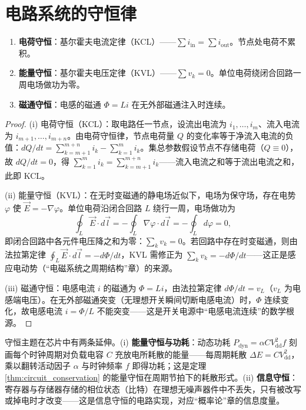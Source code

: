 \section{电路系统的守恒律}

\begin{theorem}[电路系统的三种守恒律]\label{thm:circuit_conservation}
\begin{enumerate}[label=(\roman*)]
    \item \textbf{电荷守恒}：基尔霍夫电流定律（KCL）——$\sum i_{\text{in}} = \sum i_{\text{out}}$。节点处电荷不累积。
    \item \textbf{能量守恒}：基尔霍夫电压定律（KVL）——$\sum v_k = 0$。单位电荷绕闭合回路一周电场做功为零。
    \item \textbf{磁通守恒}：电感的磁通 $\Phi = Li$ 在无外部磁通注入时连续。
\end{enumerate}
\end{theorem}

\begin{proof}
(i) 电荷守恒（KCL）：取电路任一节点，设流出电流为 $i_1,\dots,i_m$、流入电流为 $i_{m+1},\dots,i_{m+n}$。由电荷守恒律，节点电荷量 $Q$ 的变化率等于净流入电流的负值：$dQ/dt = \sum_{k=m+1}^{m+n}i_k - \sum_{k=1}^{m}i_k$。集总参数假设节点不存储电荷（$Q\equiv 0$），故 $dQ/dt=0$，得 $\sum_{k=1}^{m}i_k = \sum_{k=m+1}^{m+n}i_k$——流入电流之和等于流出电流之和，此即 KCL。

(ii) 能量守恒（KVL）：在无时变磁通的静电场近似下，电场为保守场，存在电势 $\varphi$ 使 $\vec{E} = -\nabla\varphi$。单位电荷沿闭合回路 $L$ 绕行一周，电场做功为
\[
\oint_L \vec{E}\cdot d\vec{l} = -\oint_L \nabla\varphi\cdot d\vec{l} = -\oint_L d\varphi = 0,
\]
即闭合回路中各元件电压降之和为零：$\sum_k v_k = 0$。若回路中存在时变磁通，则由法拉第定律 $\oint_L \vec{E}\cdot d\vec{l} = -d\Phi/dt$，KVL 需修正为 $\sum_k v_k = -d\Phi/dt$——这正是感应电动势（“电磁系统之周期结构”章）的来源。

(iii) 磁通守恒：电感电流 $i$ 的磁通为 $\Phi = Li$，由法拉第定律 $d\Phi/dt = v_L$（$v_L$ 为电感端电压）。在无外部磁通突变（无理想开关瞬间切断电感电流）时，$\Phi$ 连续变化，故电感电流 $i = \Phi/L$ 不能突变——这是开关电源中“电感电流连续”的数学根源。
\end{proof}

\begin{remark}[功耗与信息守恒]\label{ch24_power_info_conservation}
守恒主题在芯片中有两条延伸。(i) \textbf{能量守恒与功耗}：动态功耗 $P_{\text{dyn}} = \alpha C V_{\text{dd}}^2 f$ 刻画每个时钟周期对负载电容 $C$ 充放电所耗散的能量——每周期耗散 $\Delta E = C V_{\text{dd}}^2$，乘以翻转活动因子 $\alpha$ 与时钟频率 $f$ 即得功耗；这是定理 \ref{thm:circuit_conservation} 的能量守恒在周期节拍下的耗散形式。(ii) \textbf{信息守恒}：寄存器与存储器存储的相位状态（比特）在理想无噪声器件中不丢失，只有被改写或掉电时才改变——这是信息守恒的电路实现，对应“概率论”章的信息度量。
\end{remark}

